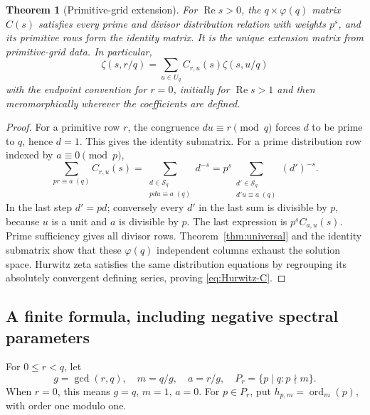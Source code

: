 \documentclass[11pt]{article}
\numberwithin{equation}{section}
\newtheorem{theorem}{Theorem}[section]
\theoremstyle{definition}
\theoremstyle{remark}
\DeclareMathOperator{\ord}{ord}
\DeclareMathOperator{\Ree}{Re}
\begin{document}
\begin{theorem}[Primitive-grid extension]\label{thm:primitive}
For $\Ree s>0$, the $q\times\varphi(q)$ matrix $C(s)$ satisfies every
prime and divisor distribution relation with weights $p^s$, and its
primitive rows form the identity matrix. It is the unique extension
matrix from primitive-grid data. In particular,
\begin{equation}\label{eq:Hurwitz-C}
 \zeta(s,r/q)=\sum_{u\in U_q}C_{r,u}(s)\zeta(s,u/q)
\end{equation}
with the endpoint convention for $r=0$, initially for $\Ree s>1$ and
then meromorphically wherever the coefficients are defined.
\end{theorem}
\begin{proof}
For a primitive row $r$, the congruence $du\equiv r\pmod q$ forces
$d$ to be prime to $q$, hence $d=1$. This gives the identity submatrix.
For a prime distribution row indexed by $a\equiv0\pmod p$,
\[
 \sum_{pr\equiv a\;(q)}C_{r,u}(s)
 =\sum_{\substack{d\in\mathcal S_q\\pdu\equiv a\;(q)}}d^{-s}
 =p^s\sum_{\substack{d'\in\mathcal S_q\\d'u\equiv a\;(q)}}(d')^{-s}.
\]
In the last step $d'=pd$; conversely every $d'$ in the last sum is
divisible by $p$, because $u$ is a unit and $a$ is divisible by $p$.
The last expression is $p^sC_{a,u}(s)$. Prime sufficiency gives all
divisor rows. Theorem~\ref{thm:universal} and the identity submatrix
show that these $\varphi(q)$ independent columns exhaust the solution
space. Hurwitz zeta satisfies the same distribution equations by
regrouping its absolutely convergent defining series, proving
\eqref{eq:Hurwitz-C}.
\end{proof}

\subsection{A finite formula, including negative spectral parameters}
For $0\le r<q$, let
\[
 g=\gcd(r,q),\quad m=q/g,\quad a=r/g,
 \quad P_r=\{p\mid q:p\nmid m\}.
\]
When $r=0$, this means $g=q$, $m=1$, $a=0$.
For $p\in P_r$, put $h_{p,m}=\ord_m(p)$, with order one modulo one.
\end{document}
